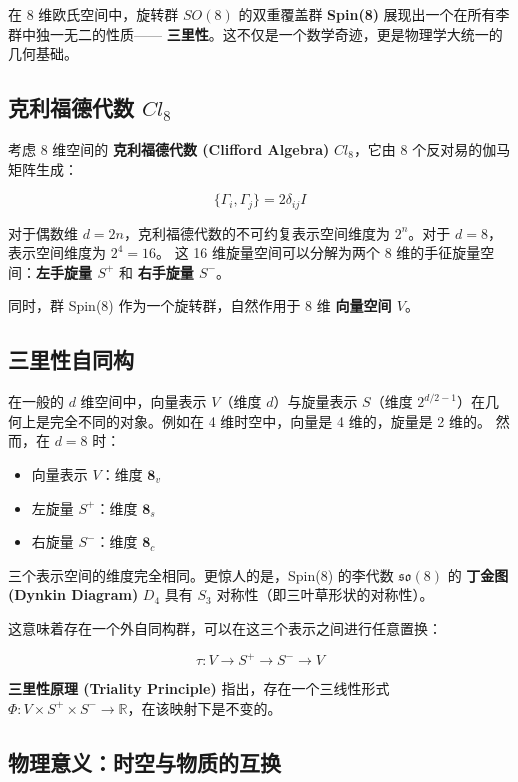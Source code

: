 在 8 维欧氏空间中，旋转群 $SO(8)$ 的双重覆盖群 \textbf{Spin(8)} 展现出一个在所有李群中独一无二的性质—— \textbf{三里性}。这不仅是一个数学奇迹，更是物理学大统一的几何基础。

\subsection{克利福德代数 $Cl_8$}

考虑 8 维空间的 \textbf{克利福德代数 (Clifford Algebra)} $Cl_8$，它由 8 个反对易的伽马矩阵生成：

\[\{\Gamma_i, \Gamma_j\} = 2\delta_{ij} I\]

对于偶数维 $d=2n$，克利福德代数的不可约复表示空间维度为 $2^n$。对于 $d=8$，表示空间维度为 $2^4 = 16$。
这 16 维旋量空间可以分解为两个 8 维的手征旋量空间：\textbf{左手旋量 $S^+$} 和 \textbf{右手旋量 $S^-$}。

同时，群 Spin(8) 作为一个旋转群，自然作用于 8 维 \textbf{向量空间 $V$}。

\subsection{三里性自同构}

在一般的 $d$ 维空间中，向量表示 $V$（维度 $d$）与旋量表示 $S$（维度 $2^{d/2-1}$）在几何上是完全不同的对象。例如在 4 维时空中，向量是 4 维的，旋量是 2 维的。
然而，在 $d=8$ 时：

\begin{itemize}
\item 向量表示 $V$：维度 $\mathbf{8}_v$
\item 左旋量 $S^+$：维度 $\mathbf{8}_s$
\item 右旋量 $S^-$：维度 $\mathbf{8}_c$
\end{itemize}

三个表示空间的维度完全相同。更惊人的是，Spin(8) 的李代数 $\mathfrak{so}(8)$ 的 \textbf{丁金图 (Dynkin Diagram)} $D_4$ 具有 $S_3$ 对称性（即三叶草形状的对称性）。

这意味着存在一个外自同构群，可以在这三个表示之间进行任意置换：

\[\tau: V \to S^+ \to S^- \to V\]

\textbf{三里性原理 (Triality Principle)} 指出，存在一个三线性形式 $\Phi: V \times S^+ \times S^- \to \mathbb{R}$，在该映射下是不变的。

\subsection{物理意义：时空与物质的互换}

